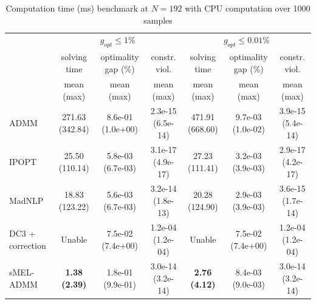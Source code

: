 \begin{table}[t]
\centering
\caption{Computation time (ms) benchmark at $N = 192$ with CPU computation over 1000 samples}
\label{tab:power_grid_N192}
\begin{tabular}{lcccccc}
\hline
 & \multicolumn{3}{c}{$g_{opt} \leq 1\%$} & \multicolumn{3}{c}{$g_{opt} \leq 0.01\%$} \\
 & solving time & optimality gap (\%) & constr. viol. & solving time & optimality gap (\%) & constr. viol. \\
 & mean (max) & mean (max) & mean (max) & mean (max) & mean (max) & mean (max) \\
\hline
ADMM & 271.63 (342.84) & 8.6e-01 (1.0e+00) & 2.3e-15 (6.5e-14) & 471.91 (668.60) & 9.7e-03 (1.0e-02) & 3.9e-15 (5.4e-14) \\
IPOPT & 25.50 (110.14) & 5.8e-03 (6.7e-03) & 3.1e-17 (4.9e-17) & 27.23 (111.41) & 3.2e-03 (3.9e-03) & 2.9e-17 (4.2e-17) \\
MadNLP & 18.83 (123.22) & 5.6e-03 (6.7e-03) & 3.2e-14 (1.8e-13) & 20.28 (124.90) & 2.9e-03 (3.9e-03) & 3.6e-15 (1.7e-14) \\
DC3 + correction & Unable & 7.5e-02 (7.4e+00) & 1.2e-04 (1.2e-04) & Unable & 7.5e-02 (7.4e+00) & 1.2e-04 (1.2e-04) \\
sMEL-ADMM & \textbf{1.38 (2.39)} & 1.8e-01 (9.9e-01) & 3.0e-14 (3.2e-14) & \textbf{2.76 (4.12)} & 8.4e-03 (9.0e-03) & 3.0e-14 (3.2e-14) \\
\hline
\end{tabular}
\end{table}
